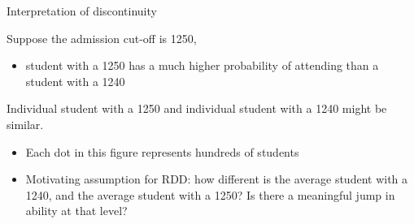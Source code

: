 \documentclass[compress, 8pt]{beamer}
\begin{document}
\begin{frame}{Interpretation of discontinuity}

Suppose the admission cut-off is 1250, 
\begin{itemize}
    \item [$\implies$] student with a 1250 has a much higher probability of attending than a student with a 1240
\end{itemize}

\vspace{3ex}
Individual student with a 1250 and individual student with a 1240 might be similar. 
\begin{itemize}
    \item Each dot in this figure represents hundreds of students
    \item Motivating assumption for RDD: how different is the average student with a 1240, and the average student with a 1250? Is there a meaningful jump in ability at that level? 
\end{itemize}


\end{frame}




\end{document}
